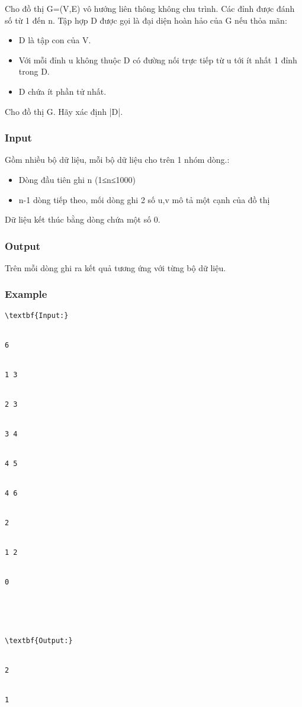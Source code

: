 



   Cho đồ thị G=(V,E) vô hướng liên thông không chu trình. Các đỉnh được đánh số từ 1 đến n. Tập hợp D được gọi là đại diện hoàn hảo của G nếu thỏa mãn:  
\begin{itemize}
	\item     D là tập con của V.   
	\item     Với mỗi đỉnh u không thuộc D có đường nối trực tiếp từ u tới ít nhất 1 đỉnh trong D.   
	\item     D chứa ít phần tử nhất.   
\end{itemize}

   Cho đồ thị G. Hãy xác định |D|.  

\subsubsection{   Input  }

   Gồm nhiều bộ dữ liệu, mỗi bộ dữ liệu cho trên 1 nhóm dòng.:  
\begin{itemize}
	\item     Dòng đầu tiên ghi n (1≤n≤1000)   
	\item     n-1 dòng tiếp theo, mối dòng ghi 2 số u,v mô tả một cạnh của đồ thị   
\end{itemize}

   Dữ liệu kết thúc bằng dòng chứa một số 0.  

\subsubsection{   Output  }

   Trên mỗi dòng ghi ra kết quả tương ứng với từng bộ dữ liệu.  

\subsubsection{   Example  }
\begin{verbatim}
\textbf{Input:}


6


1 3


2 3


3 4


4 5


4 6


2


1 2


0





\textbf{Output:}


2


1\end{verbatim}
